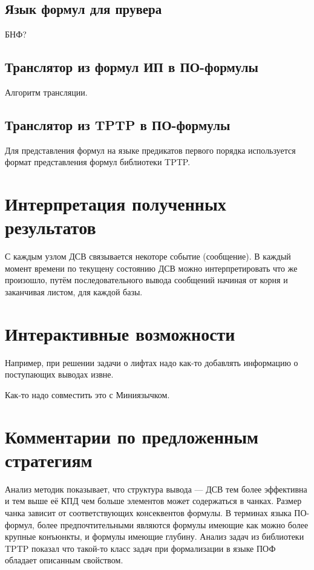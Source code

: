 \subsection{Язык формул для прувера}
БНФ?

\subsection{Транслятор из формул ИП в ПО-формулы}
Алгоритм трансляции.

\subsection{Транслятор из TPTP в ПО-формулы}
Для представления формул на языке предикатов первого порядка используется формат представления формул библиотеки TPTP.

\section{Интерпретация полученных результатов}
С каждым узлом ДСВ связывается некоторе событие (сообщение). В каждый момент времени по текущену состоянию ДСВ можно интерпретировать что же произошло, путём последовательного вывода сообщений начиная от корня и заканчивая листом, для каждой базы.


\section{Интерактивные возможности}
Например, при решении задачи о лифтах надо как-то добавлять информацию о поступающих выводах извне.

Как-то надо совместить это с Миниязычком.

\section{Комментарии по предложенным стратегиям}
Анализ методик показывает, что структура вывода --- ДСВ тем более эффективна и тем выше её КПД чем больше элементов может содержаться в чанках. Размер чанка зависит от соответствующих консеквентов формулы. В терминах языка ПО-формул, более предпочтительными являются формулы имеющие как можно более крупные конъюнкты, и формулы имеющие глубину. Анализ задач из библиотеки TPTP показал что такой-то класс задач при формализации в языке ПОФ обладает описанным свойством.

